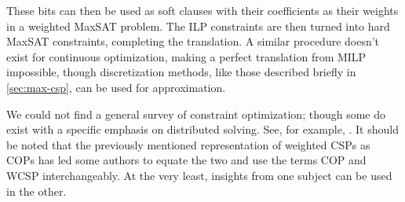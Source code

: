 These bits can then be used as soft clauses with their coefficients as their weights in a weighted MaxSAT problem. The ILP constraints are then turned into hard MaxSAT constraints, completing the translation. A similar procedure doesn't exist for continuous optimization, making a perfect translation from MILP impossible, though discretization methods, like those described briefly in \ref{sec:max-csp}, can be used for approximation.

We could not find a general survey of constraint optimization; though some do exist with a specific emphasis on distributed solving. See, for example, \citep{fioretto2018distributed}. It should be noted that the previously mentioned representation of weighted CSPs as COPs has led some authors to equate the two and use the terms COP and WCSP interchangeably. At the very least, insights from one subject can be used in the other.



